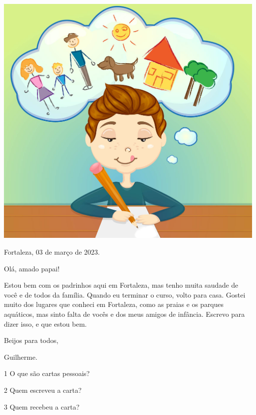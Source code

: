 \begin{conteudo}{

\begin{center}
\includegraphics[width=.6\textwidth]{media/image7c.jpg}
\end{center}  

\begin{flushright}
Fortaleza, 03 de março de 2023.
\end{flushright}

Olá, amado papai!

Estou bem com os padrinhos aqui em Fortaleza, mas tenho muita saudade de
você e de todos da família. Quando eu terminar o curso, 
volto para casa. Gostei muito dos lugares que conheci em
Fortaleza, como as praias e os parques aquáticos, mas sinto falta de
vocês e dos meus amigos de infância. Escrevo para dizer isso, e que
estou bem.

\begin{flushright}
Beijos para todos,

Guilherme.
\end{flushright}

}


\num{1} O que são cartas pessoais?


\num{2} Quem escreveu a carta?


\num{3} Quem recebeu a carta?


\end{conteudo}
